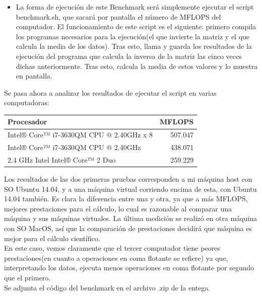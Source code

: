 \begin{itemize}
\begin{itemize}
		\item La forma de ejecución de este Benchmark será simplemente ejecutar el script benchmark.sh, que sacará por pantalla el número de MFLOPS del computador. El funcionamiento de este script es el siguiente: primero compila los programas necesarios para la ejecución(el que invierte la matriz y el que calcula la media de los datos). Tras esto, llama y guarda los resultados de la ejecución del programa que calcula la inversa de la matriz las cinco veces dichas anteriormente. Tras esto, calcula la media de estos valores y lo muestra en pantalla.
	\end{itemize}
	
	Se pasa ahora a analizar los resultados de ejecutar el script en varias computadoras:\\
	
	\begin{center}
		\begin{tabular}{| l || r | }
			\hline
			Procesador & MFLOPS\\ \hline \hline
			Intel® Core™ i7-3630QM CPU @ 2.40GHz x 8  & 507.047 \\ \hline
			Intel® Core™ i7-3630QM CPU @ 2.40GHz & 438.071	\\ \hline
			2.4 GHz Intel Intel® Core™ 2 Duo & 259.229 \\
			\hline
		\end{tabular}
	\end{center}
	
	Los resultados de las dos primeras pruebas corresponden a mi máquina host con SO Ubuntu 14.04, y a una máquina virtual corriendo encima de esta, con Ubuntu 14.04 también. Es clara la diferencia entre una y otra, ya que a más MFLOPS, mejores prestaciones para el cálculo, lo cual es razonable al comparar una máquina y sus máquinas virtuales. La última medición se realizó en otra máquina con SO MacOS, así que la comparación de prestaciones decidirá que máquina es mejor para el cálculo científico.\\
	
	En este caso, vemos claramente que el tercer computador tiene peores prestaciones(en cuanto a operaciones en coma flotante se refiere) ya que, interpretando los datos, ejecuta menos operaciones en coma flotante por segundo que el primero. \\
	
	Se adjunta el código del benchmark en el archivo .zip de la entega.
	
\end{itemize}



